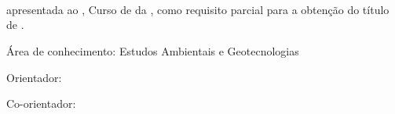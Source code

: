 \begin{folharosto}

\begin{center}
\theauthor
\end{center}
\ \\
\ \\
\ \\
\ \\
\ \\
\begin{spacing}{2}
   \begin{center}
   {\LARGE {\bf \thetitle}}
   \end{center}
\end{spacing}
\ \\
\ \\
\ \\
\begin{flushright}

   \begin{list}{}{
      \setlength{\leftmargin}{4.5cm}
      \setlength{\rightmargin}{0cm}
      \setlength{\labelwidth}{0pt}
      \setlength{\labelsep}{\leftmargin}}

      \item \thetypework apresentada ao \thefaculty, Curso de \thecourse
      da \theuniversity, como requisito parcial para a obtenção do
      título de {\bf \thedegreetitle}.

    \begin{list}{}{
      \setlength{\leftmargin}{0cm}
      \setlength{\rightmargin}{0cm}
      \setlength{\labelwidth}{0pt}
      \setlength{\labelsep}{\leftmargin}}

      \item Área de conhecimento: Estudos Ambientais e Geotecnologias

      \item Orientador: \theadvisor
      \newline \hspace*{2.1cm}  {\footnotesize {\it \theuniversity}}
      
      \ifcoor
          \item Co-orientador: \thecoadvisor
          \newline \hspace*{2.1cm}  {\footnotesize \emph{\ppgmcooruniv}}
      \fi
      \end{list}
   \end{list}


\end{flushright}
\end{folharosto}
